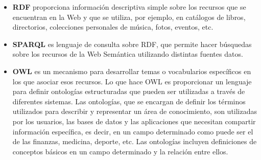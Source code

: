 \documentclass[10pt,a4paper]{article}
\begin{document}
\begin{itemize}
\item \textbf{RDF} proporciona información descriptiva simple sobre los recursos que se encuentran en la Web y que se utiliza, por ejemplo, en catálogos de libros, directorios, colecciones personales de música, fotos, eventos, etc.
\item \textbf{SPARQL} es lenguaje de consulta sobre RDF, que permite hacer búsquedas sobre los recursos de la Web Semántica utilizando distintas fuentes datos.
\item \textbf{OWL} es un mecanismo para desarrollar temas o vocabularios específicos en los que asociar esos recursos. Lo que hace OWL es proporcionar un lenguaje para definir ontologías estructuradas que pueden ser utilizadas a través de diferentes sistemas. Las ontologías, que se encargan de definir los términos utilizados para describir y representar un área de conocimiento, son utilizadas por los usuarios, las bases de datos y las aplicaciones que necesitan compartir información específica, es decir, en un campo determinado como puede ser el de las finanzas, medicina, deporte, etc. Las ontologías incluyen definiciones de conceptos básicos en un campo determinado y la relación entre ellos.
\end{itemize}
\end{document}
